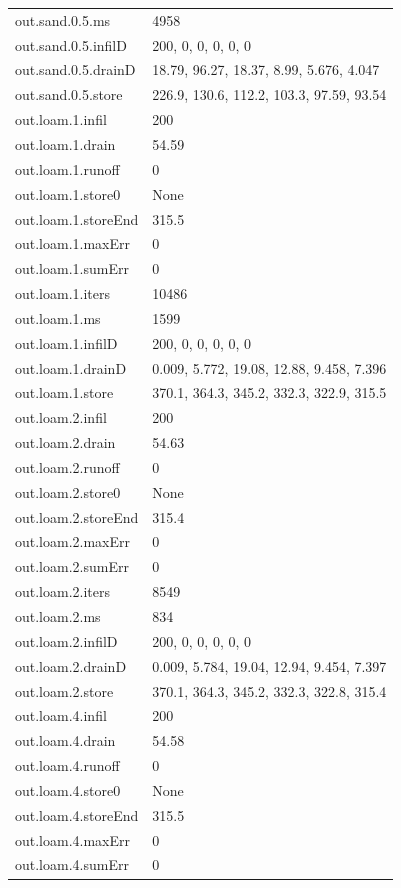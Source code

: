{\begin{longtable}{p{}p{}}
{}out.sand.0.5.ms & 4958\\
{}out.sand.0.5.infilD & 200, 0, 0, 0, 0, 0\\
{}out.sand.0.5.drainD & 18.79, 96.27, 18.37, 8.99, 5.676, 4.047\\
{}out.sand.0.5.store & 226.9, 130.6, 112.2, 103.3, 97.59, 93.54\\
{}out.loam.1.infil & 200\\
{}out.loam.1.drain & 54.59\\
{}out.loam.1.runoff & 0\\
{}out.loam.1.store0 & None\\
{}out.loam.1.storeEnd & 315.5\\
{}out.loam.1.maxErr & 0\\
{}out.loam.1.sumErr & 0\\
{}out.loam.1.iters & 10486\\
{}out.loam.1.ms & 1599\\
{}out.loam.1.infilD & 200, 0, 0, 0, 0, 0\\
{}out.loam.1.drainD & 0.009, 5.772, 19.08, 12.88, 9.458, 7.396\\
{}out.loam.1.store & 370.1, 364.3, 345.2, 332.3, 322.9, 315.5\\
{}out.loam.2.infil & 200\\
{}out.loam.2.drain & 54.63\\
{}out.loam.2.runoff & 0\\
{}out.loam.2.store0 & None\\
{}out.loam.2.storeEnd & 315.4\\
{}out.loam.2.maxErr & 0\\
{}out.loam.2.sumErr & 0\\
{}out.loam.2.iters & 8549\\
{}out.loam.2.ms & 834\\
{}out.loam.2.infilD & 200, 0, 0, 0, 0, 0\\
{}out.loam.2.drainD & 0.009, 5.784, 19.04, 12.94, 9.454, 7.397\\
{}out.loam.2.store & 370.1, 364.3, 345.2, 332.3, 322.8, 315.4\\
{}out.loam.4.infil & 200\\
{}out.loam.4.drain & 54.58\\
{}out.loam.4.runoff & 0\\
{}out.loam.4.store0 & None\\
{}out.loam.4.storeEnd & 315.5\\
{}out.loam.4.maxErr & 0\\
{}out.loam.4.sumErr & 0\\

\end{longtable}}
